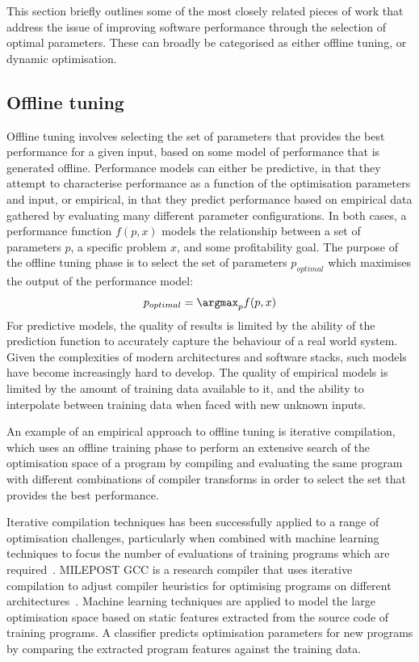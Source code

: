 This section briefly outlines some of the most closely related pieces
of work that address the issue of improving software performance
through the selection of optimal parameters. These can broadly be
categorised as either offline tuning, or dynamic optimisation.

\subsection{Offline tuning}\label{subsec:offline-tuning}
Offline tuning involves selecting the set of parameters that provides
the best performance for a given input, based on some model of
performance that is generated offline. Performance models can either
be predictive, in that they attempt to characterise performance as a
function of the optimisation parameters and input, or empirical, in
that they predict performance based on empirical data gathered by
evaluating many different parameter configurations. In both cases, a
performance function $f(p,x)$ models the relationship between a set of
parameters $p$, a specific problem $x$, and some profitability
goal. The purpose of the offline tuning phase is to select the set of
parameters $p_{optimal}$ which maximises the output of the performance
model:
\begin{align*}
  p_{optimal} = \argmax_{p}f(p,x)
\end{align*}
For predictive models, the quality of results is limited by the
ability of the prediction function to accurately capture the behaviour
of a real world system. Given the complexities of modern architectures
and software stacks, such models have become increasingly hard to
develop.
The quality of empirical models is limited by the amount of training
data available to it, and the ability to interpolate between training
data when faced with new unknown inputs.

An example of an empirical approach to offline tuning is iterative
compilation, which uses an offline training phase to perform an
extensive search of the optimisation space of a program by compiling
and evaluating the same program with different combinations of
compiler transforms in order to select the set that provides the best
performance.

Iterative compilation techniques has been successfully applied to a
range of optimisation challenges, particularly when combined with
machine learning techniques to focus the number of evaluations of
training programs which are required~\cite{Agakov}. MILEPOST GCC is a
research compiler that uses iterative compilation to adjust compiler
heuristics for optimising programs on different
architectures~\cite{Fursin2008}. Machine learning techniques are
applied to model the large optimisation space based on static features
extracted from the source code of training programs. A classifier
predicts optimisation parameters for new programs by comparing the
extracted program features against the training data.

